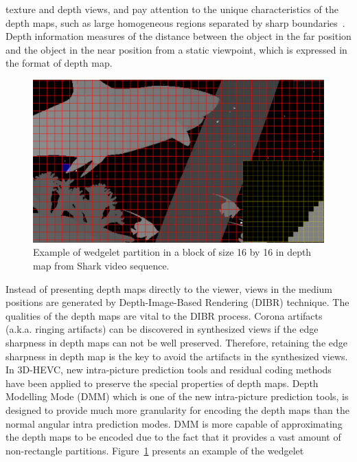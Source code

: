 texture and depth views, and pay attention to the unique characteristics of
the depth maps, such as large homogeneous
regions separated by sharp boundaries~\parencite{RN47}.\\
\newline
Depth information measures of the distance between the object in the far position
and the object in the near position from a static viewpoint,
which is expressed in the format of depth map.
\begin{figure}[!t]
    \centering
    \includegraphics[width=\textwidth,height=\textheight,keepaspectratio]{Figures/wedgelet}
    \caption[Wedgelet partition illustration]
    {Example of wedgelet partition in a block of size 16 by 16 in depth map
    from Shark video sequence.
    }
    \label{fig:wedgelet-partition}
\end{figure}
Instead of presenting depth maps directly to the viewer, views in the medium
positions are generated by Depth-Image-Based Rendering (DIBR) technique.
The qualities of the depth maps are vital to the DIBR process.
Corona artifacts (a.k.a. ringing artifacts) can be discovered in synthesized
views if the edge sharpness in depth maps can not be well
preserved.
Therefore, retaining the edge sharpness in depth map is the key to avoid the
artifacts in the synthesized views.
In 3D-HEVC, new intra-picture prediction tools and residual coding methods
have been applied to preserve the special properties of depth maps.
Depth Modelling Mode (DMM) which is one of the new intra-picture
prediction tools, is designed to provide much more granularity for
encoding the depth maps than the normal angular intra prediction modes.
DMM is more capable of approximating the depth maps to be encoded due to
the fact that it provides a vast amount of non-rectangle partitions.
Figure~\ref{fig:wedgelet-partition} presents an example of the wedgelet
